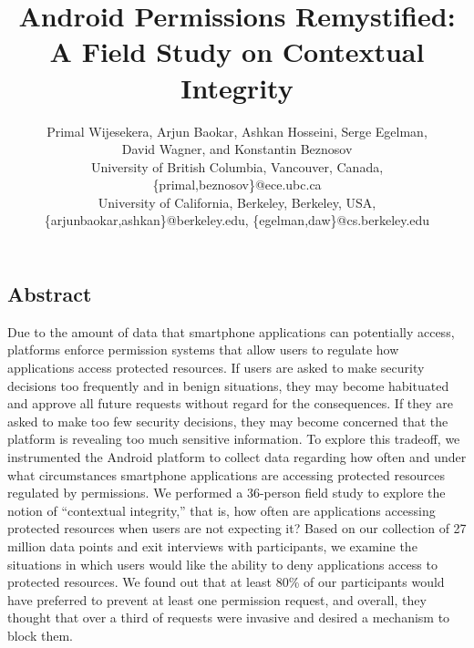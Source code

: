 \documentclass[letterpaper,twocolumn,10pt]{article}
\begin{document}
\date{}

\title{Android Permissions Remystified:\\A Field Study on Contextual Integrity}



\author{
{\rm Primal Wijesekera, Arjun Baokar, Ashkan Hosseini, Serge Egelman,}\\
{\rm David Wagner, and Konstantin Beznosov}\\
University of British Columbia, Vancouver, Canada,\\
\vspace{0.5em}
\{primal,beznosov\}@ece.ubc.ca\\
University of California, Berkeley, Berkeley, USA,\\
\{arjunbaokar,ashkan\}@berkeley.edu, \{egelman,daw\}@cs.berkeley.edu\\
} 

\maketitle




\subsection*{Abstract}
Due to the amount of data that smartphone applications can potentially access, platforms enforce permission systems that allow users to regulate how applications access protected resources. If users are asked to make security decisions too frequently and in benign situations, they may become habituated and approve all future requests without regard for the consequences. If they are asked to make too few security decisions, they may become concerned that the platform is revealing too much sensitive information. To explore this tradeoff, we instrumented the Android platform to collect data regarding how often and under what circumstances smartphone applications are accessing protected resources regulated by permissions. We performed a 36-person field study to explore the notion of ``contextual integrity,'' that is, how often are applications accessing protected resources when users are not expecting it? Based on our collection of 27 million data points and exit interviews with participants, we examine the situations in which users would like the ability to deny applications access to protected resources. We found out that at least 80\% of our participants would have preferred to prevent at least one permission request, and overall, they thought that over a third of requests were invasive and desired a mechanism to block them.
\end{document}
